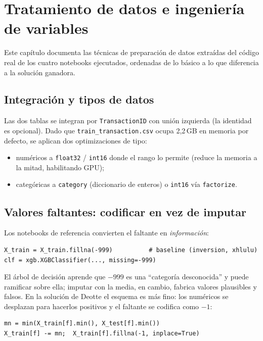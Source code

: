 \chapter{Tratamiento de datos e ingeniería de variables}
\label{cap:tratamiento}

Este capítulo documenta las técnicas de preparación de datos extraídas del código real de los
cuatro notebooks ejecutados, ordenadas de lo básico a lo que diferencia a la solución ganadora.

\section{Integración y tipos de datos}

Las dos tablas se integran por \texttt{TransactionID} con unión izquierda (la identidad es
opcional). Dado que \texttt{train\_transaction.csv} ocupa 2{,}2\,GB en memoria por defecto, se
aplican dos optimizaciones de tipo:

\begin{itemize}
  \item numéricos a \texttt{float32} / \texttt{int16} donde el rango lo permite (reduce la
        memoria a la mitad, habilitando GPU);
  \item categóricas a \texttt{category} (diccionario de enteros) o \texttt{int16} vía
        \texttt{factorize}.
\end{itemize}

\section{Valores faltantes: codificar en vez de imputar}

Los notebooks de referencia convierten el faltante en \emph{información}:

\begin{lstlisting}
X_train = X_train.fillna(-999)          # baseline (inversion, xhlulu)
clf = xgb.XGBClassifier(..., missing=-999)
\end{lstlisting}

El árbol de decisión aprende que $-999$ es una ``categoría desconocida'' y puede ramificar
sobre ella; imputar con la media, en cambio, fabrica valores plausibles y falsos. En la
solución de Deotte el esquema es más fino: los numéricos se desplazan para hacerlos positivos
y el faltante se codifica como $-1$:
\begin{lstlisting}
mn = min(X_train[f].min(), X_test[f].min())
X_train[f] -= mn;  X_train[f].fillna(-1, inplace=True)
\end{lstlisting}

